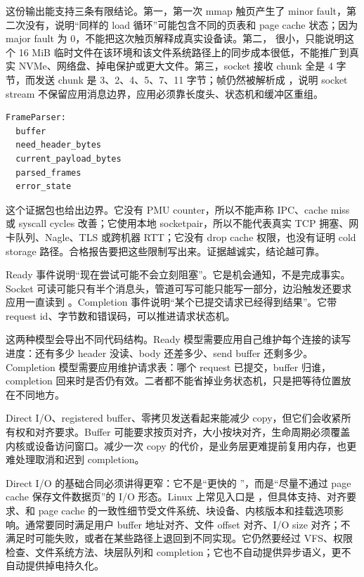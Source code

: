 这份输出能支持三条有限结论。第一，第一次 mmap 触页产生了 minor fault，第二次没有，说明“同样的 load 循环”可能包含不同的页表和 page cache 状态；因为 major fault 为 0，不能把这次触页解释成真实设备读。第二， 很小，只能说明这个 16 MiB 临时文件在该环境和该文件系统路径上的同步成本很低，不能推广到真实 NVMe、网络盘、掉电保护或更大文件。第三，socket 接收 chunk 全是 4 字节，而发送 chunk 是 3、2、4、5、7、11 字节；帧仍然被解析成 ，说明 socket stream 不保留应用消息边界，应用必须靠长度头、状态机和缓冲区重组。

\begin{lstlisting}[numbers=none,caption={socket stream parser 的必要状态}]
FrameParser:
  buffer
  need_header_bytes
  current_payload_bytes
  parsed_frames
  error_state
\end{lstlisting}

这个证据包也给出边界。它没有 PMU counter，所以不能声称 IPC、cache miss 或 syscall cycles 改善；它使用本地 socketpair，所以不能代表真实 TCP 拥塞、网卡队列、Nagle、TLS 或跨机器 RTT；它没有 drop cache 权限，也没有证明 cold storage 路径。合格报告要把这些限制写出来。证据越诚实，结论越可靠。

Ready 事件说明“现在尝试可能不会立刻阻塞”。它是机会通知，不是完成事实。Socket 可读可能只有半个消息头，管道可写可能只能写一部分，边沿触发还要求应用一直读到 。Completion 事件说明“某个已提交请求已经得到结果”。它带 request id、字节数和错误码，可以推进请求状态机。

这两种模型会导出不同代码结构。Ready 模型需要应用自己维护每个连接的读写进度：还有多少 header 没读、body 还差多少、send buffer 还剩多少。Completion 模型需要应用维护请求表：哪个 request 已提交，buffer 归谁，completion 回来时是否仍有效。二者都不能省掉业务状态机，只是把等待位置放在不同地方。

Direct I/O、registered buffer、零拷贝发送看起来能减少 copy，但它们会收紧所有权和对齐要求。Buffer 可能要求按页对齐，大小按块对齐，生命周期必须覆盖内核或设备访问窗口。减少一次 copy 的代价，是业务层更难提前复用内存，也更难处理取消和迟到 completion。

Direct I/O 的基础合同必须讲得更窄：它不是“更快的 ”，而是“尽量不通过 page cache 保存文件数据页”的 I/O 形态。Linux 上常见入口是 ，但具体支持、对齐要求、和 page cache 的一致性细节受文件系统、块设备、内核版本和挂载选项影响。通常要同时满足用户 buffer 地址对齐、文件 offset 对齐、I/O size 对齐；不满足时可能失败，或者在某些路径上退回到不同实现。它仍然要经过 VFS、权限检查、文件系统方法、块层队列和 completion；它也不自动提供异步语义，更不自动提供掉电持久化。

